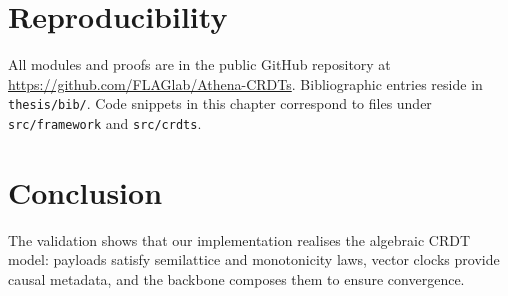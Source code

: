 \section{Reproducibility}

All modules and proofs are in the public GitHub repository at \url{https://github.com/FLAGlab/Athena-CRDTs}. Bibliographic entries reside in \texttt{thesis/bib/}. Code snippets in this chapter correspond to files under \texttt{src/framework} and \texttt{src/crdts}.

\section{Conclusion}

The validation shows that our implementation realises the algebraic CRDT model: payloads satisfy semilattice and monotonicity laws, vector clocks provide causal metadata, and the backbone composes them to ensure convergence.

\endinput
